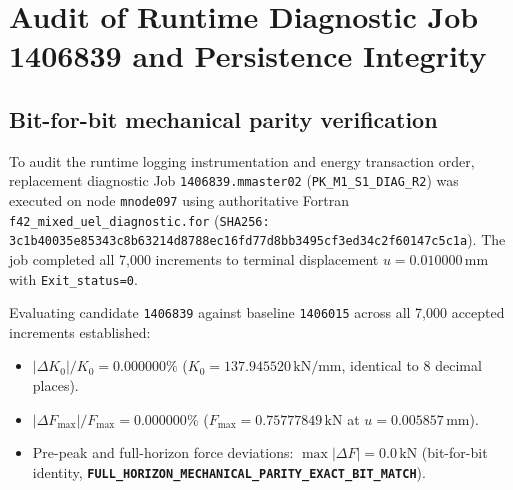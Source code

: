 \section{Audit of Runtime Diagnostic Job 1406839 and Persistence Integrity}
\label{sec:diagnostic_audit}

\subsection{Bit-for-bit mechanical parity verification}
To audit the runtime logging instrumentation and energy transaction order, replacement diagnostic Job \texttt{1406839.mmaster02} (\texttt{PK\_M1\_S1\_DIAG\_R2}) was executed on node \texttt{mnode097} using authoritative Fortran \nolinkurl{f42_mixed_uel_diagnostic.for} (\texttt{SHA256: 3c1b40035e85343c8b63214d8788ec16fd77d8bb3495cf3ed34c2f60147c5c1a}). The job completed all 7,000 increments to terminal displacement $u = 0.010000\,\mathrm{mm}$ with \texttt{Exit\_status=0}.

Evaluating candidate \texttt{1406839} against baseline \texttt{1406015} across all 7,000 accepted increments established:
\begin{itemize}
  \item $|\Delta K_0| / K_0 = 0.000000\%$ ($K_0 = 137.945520\,\mathrm{kN/mm}$, identical to 8 decimal places).
  \item $|\Delta F_{\max}| / F_{\max} = 0.000000\%$ ($F_{\max} = 0.75777849\,\mathrm{kN}$ at $u = 0.005857\,\mathrm{mm}$).
  \item Pre-peak and full-horizon force deviations: $\max |\Delta F| = 0.0\,\mathrm{kN}$ (bit-for-bit identity, \textbf{\texttt{FULL\_HORIZON\_MECHANICAL\_PARITY\_EXACT\_BIT\_MATCH}}).
\end{itemize}

